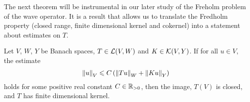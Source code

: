 \documentclass[12pt]{article}
\begin{document}
The next theorem will be instrumental in our later study of the Freholm problem of the wave operator. It is a result that allows us to translate the Fredholm property (closed range, finite dimensional kernel and cokernel) into a statement about estimates on $T$. 
\begin{ftheorem} \label{theorem: fredholm estimates}
    Let $V$, $W$, $Y$ be Banach spaces, $T \in \L(V, W)$ and $K \in \K(V, Y)$. If for all $u \in V$, the estimate 
    \begin{align*}
    \norm[u]_V \leq C \brac{\norm[Tu]_W + \norm[Ku]_Y}
    \end{align*}
    holds for some positive real constant $C \in \R_{> 0}$, then the image, $T(V)$ is closed, and $T$ has finite dimensional kernel. 
\end{ftheorem}
\end{document}
